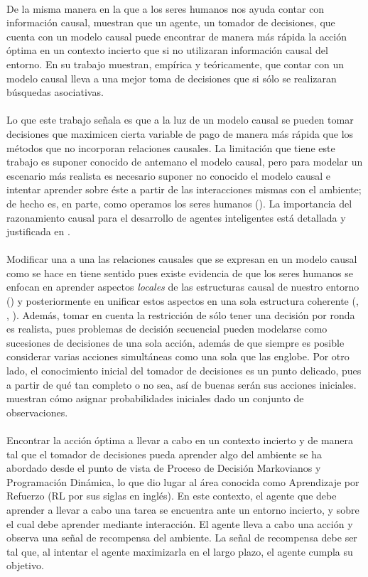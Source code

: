 \documentclass[11pt]{article}
\theoremstyle{plain}
\begin{document}
\\
\indent De la misma manera en la que a los seres humanos nos ayuda contar con información causal, \cite{lattimoreNIPS2016} muestran que un agente, un tomador de decisiones, que cuenta con un modelo causal puede encontrar de manera más rápida la acción óptima en un contexto incierto que si no utilizaran información causal del entorno. En su trabajo muestran, empírica y teóricamente, que contar con un modelo causal lleva a una mejor toma de decisiones que si sólo se realizaran búsquedas asociativas.\\
\\
\indent Lo que este trabajo señala es que a la luz de un modelo causal se pueden tomar decisiones que maximicen cierta variable de pago de manera más rápida que los métodos que no incorporan relaciones causales. La limitación que tiene este trabajo es suponer conocido de antemano el modelo causal, pero para modelar un escenario más realista es necesario suponer no conocido el modelo causal e intentar aprender sobre éste a partir de las interacciones mismas con el ambiente; de hecho es, en parte, como operamos los seres humanos (\cite{hagmayer2013repeated}). La importancia del razonamiento causal para el desarrollo de agentes inteligentes está detallada y justificada en \cite{lake2017building}.\\
\\
\indent Modificar una a una las relaciones causales que se expresan en un modelo causal como se hace en \cite{wellen2012learning} tiene sentido pues existe evidencia de que los seres humanos se enfocan en aprender aspectos \textit{locales} de las estructuras causal de nuestro entorno (\cite{danks2014unifying}) y posteriormente en unificar estos aspectos en una sola estructura coherente (\cite{fernbach2009causal}, \cite{waldmann2008causal}, \cite{wellen2012learning}). Además, tomar en cuenta la restricción de sólo tener una decisión por ronda es realista, pues problemas de decisión secuencial pueden modelarse como sucesiones de decisiones de una sola acción, además de que siempre es posible considerar varias acciones simultáneas como una sola que las englobe. Por otro lado, el conocimiento inicial del tomador de decisiones es un punto delicado, pues a partir de qué tan completo o no sea, así de buenas serán sus acciones iniciales. \cite{billot2005probabilities} muestran cómo asignar probabilidades iniciales dado un conjunto de observaciones.\\
\\
\indent Encontrar la acción óptima a llevar a cabo en un contexto incierto y de manera tal que el tomador de decisiones pueda aprender algo del ambiente se ha abordado desde el punto de vista de Proceso de Decisión Markovianos y Programación Dinámica, lo que dio lugar al área conocida como Aprendizaje por Refuerzo (RL por sus siglas en inglés). En este contexto, el agente que debe aprender a llevar a cabo una tarea se encuentra ante un entorno incierto, y sobre el cual debe aprender mediante interacción. El agente lleva a cabo una acción y observa una señal de recompensa del ambiente. La señal de recompensa debe ser tal que, al intentar el agente maximizarla en el largo plazo, el agente cumpla su objetivo.\\
\end{document}
